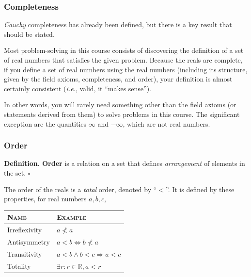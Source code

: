 \documentclass[letterpaper,twoside]{article}
\def\SmallHSpace{\hspace*{1mm}}
\newcommand\Ie[1]{\textit{i.e.}, #1}
\newcommand{\DefinedTerm}[1]{\textbf{#1}}
\newcommand{\Definition}[1]{%
    \emoji{book} \textbf{Definition.}\SmallHSpace #1 \hfill $\square$
}
\begin{document}
\begin{multicols}{2}

\subsubsection{Completeness}

\textit{Cauchy} completeness has already been defined, but there is a key result that should be stated.

Most problem-solving in this course consists of discovering the definition of a set of real numbers that satisfies the given problem.
Because the reals are complete, if you define a set of real numbers using the real numbers (including its structure, given by the field axioms, completeness, and order), your definition is almost certainly consistent (\Ie{valid, it ``makes sense''}).

In other words, you will rarely need something other than the field axioms (or statements derived from them) to solve problems in this course.
The significant exception are the quantities $\infty$ and $-\infty$, which are not real numbers.

\subsubsection{Order}

\Definition
{
    \DefinedTerm{Order} is a relation on a set that defines \textit{arrangement} of elements in the set.
}

The order of the reals is a \textit{total} order, denoted by ``$<$''.
It is defined by these properties, for real numbers $a,b,c$,

\end{multicols}
\begin{table}[H]
    \centering
    \doublespacing
    \setlength\tabcolsep{0pt}
    \begin{tabular*}{0.333\linewidth}{@{\extracolsep{\fill}} ll}
        \textsc{Name} & \textsc{Example} \\
        \hline
        Irreflexivity & $a \not< a$ \\
        Antisymmetry  & $a<b \Longleftrightarrow b \not< a$ \\
        Transitivity  & $a<b \land b<c \Longrightarrow a < c$ \\
        Totality      & $\exists r : r \in \mathbb{R}, a < r$ \\
    \end{tabular*}
    \normalsize
\end{table}
\end{document}

